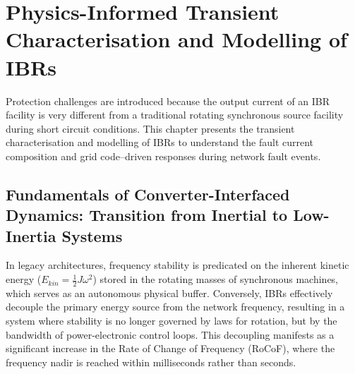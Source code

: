 \chapter{Physics-Informed Transient Characterisation and Modelling of IBRs} \label{ch_2}

Protection challenges are introduced because the output current of an IBR facility is very different from a traditional rotating synchronous source facility during short circuit conditions. This chapter presents the transient characterisation and modelling of IBRs to understand the fault current composition and grid code–driven responses during network fault events.

\section{Fundamentals of Converter-Interfaced Dynamics: Transition from Inertial to Low-Inertia Systems}
In legacy architectures, frequency stability is predicated on the inherent kinetic energy ($E_{kin} = \frac{1}{2} J \omega^2$) stored in the rotating masses of synchronous machines, which serves as an autonomous physical buffer. Conversely, IBRs effectively decouple the primary energy source from the network frequency, resulting in a system where stability is no longer governed by laws for rotation, but by the bandwidth of power-electronic control loops. This decoupling manifests as a significant increase in the Rate of Change of Frequency (RoCoF), where the frequency nadir is reached within milliseconds rather than seconds.

